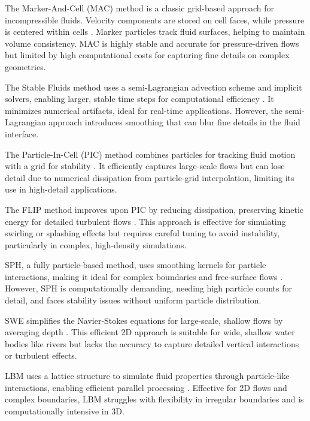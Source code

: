 The Marker-And-Cell (MAC) method is a classic grid-based approach for incompressible fluids. Velocity components are stored on cell faces, while pressure is centered within cells \cite{Harlow1965}. Marker particles track fluid surfaces, helping to maintain volume consistency. MAC is highly stable and accurate for pressure-driven flows but limited by high computational costs for capturing fine details on complex geometries.

The Stable Fluids method uses a semi-Lagrangian advection scheme and implicit solvers, enabling larger, stable time steps for computational efficiency \cite{Stam1999}. It minimizes numerical artifacts, ideal for real-time applications. However, the semi-Lagrangian approach introduces smoothing that can blur fine details in the fluid interface.

The Particle-In-Cell (PIC) method combines particles for tracking fluid motion with a grid for stability \cite{Harlow1962}. It efficiently captures large-scale flows but can lose detail due to numerical dissipation from particle-grid interpolation, limiting its use in high-detail applications.

The FLIP method improves upon PIC by reducing dissipation, preserving kinetic energy for detailed turbulent flows \cite{Brackbill1988}. This approach is effective for simulating swirling or splashing effects but requires careful tuning to avoid instability, particularly in complex, high-density simulations.

SPH, a fully particle-based method, uses smoothing kernels for particle interactions, making it ideal for complex boundaries and free-surface flows \cite{Monaghan2005}. However, SPH is computationally demanding, needing high particle counts for detail, and faces stability issues without uniform particle distribution.

SWE simplifies the Navier-Stokes equations for large-scale, shallow flows by averaging depth \cite{Vreugdenhil1994}. This efficient 2D approach is suitable for wide, shallow water bodies like rivers but lacks the accuracy to capture detailed vertical interactions or turbulent effects.

LBM uses a lattice structure to simulate fluid properties through particle-like interactions, enabling efficient parallel processing \cite{Chen1998}. Effective for 2D flows and complex boundaries, LBM struggles with flexibility in irregular boundaries and is computationally intensive in 3D.


